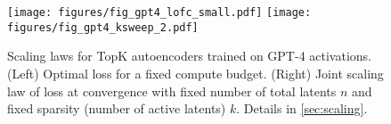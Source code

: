 \begin{figure}[t]
    \centering
    \texttt{[image: figures/fig\_gpt4\_lofc\_small.pdf]}
        \texttt{[image: figures/fig\_gpt4\_ksweep\_2.pdf]}
    \caption{
        Scaling laws for TopK autoencoders trained on GPT-4 activations.
        (Left) Optimal loss for a fixed compute budget.
        (Right) Joint scaling law of loss at convergence with fixed number of total latents $n$ and fixed sparsity (number of active latents) $k$.  Details in \autoref{sec:scaling}.
        }
    \label{fig:scaling_n}
\end{figure}


